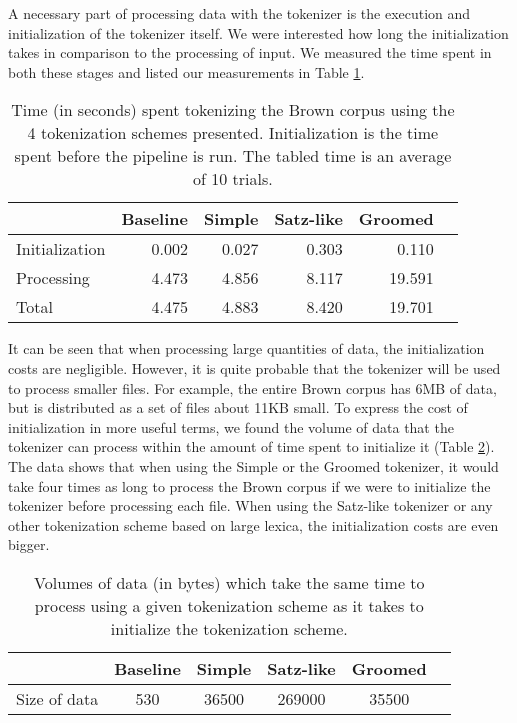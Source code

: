 A necessary part of processing data with the tokenizer is the execution and
initialization of the tokenizer itself. We were interested how long the
initialization takes in comparison to the processing of input. We measured the
time spent in both these stages and listed our measurements in Table
\ref{tbl:timeline}.

\begin{table}
  \begin{center}
    \begin{tabular}{ | l | r | r | r | r | r | }
      \hline
      & Baseline & Simple & Satz-like & Groomed \\ \hline
      Initialization & 0.002 & 0.027 & 0.303 & 0.110 \\ \hline
      Processing & 4.473 & 4.856 & 8.117 & 19.591 \\ \hline
      Total & 4.475 & 4.883 & 8.420 & 19.701 \\
      \hline
    \end{tabular}
  \end{center}
  \caption[Time spent in individual initialization steps]
    {Time (in seconds) spent tokenizing the Brown corpus using the 4
    tokenization schemes presented. Initialization is the time spent before the
    pipeline is run. The tabled time is an average of 10 trials.}
  \label{tbl:timeline}
\end{table}

It can be seen that when processing large quantities of data, the
initialization costs are negligible. However, it is quite probable that the
tokenizer will be used to process smaller files. For example, the entire Brown
corpus has 6MB of data, but is distributed as a set of files about 11KB small.
To express the cost of initialization in more useful terms, we found the volume
of data that the tokenizer can process within the amount of time spent to
initialize it (Table \ref{tbl:init-sizes}). The data shows that when using the
Simple or the Groomed tokenizer, it would take four times as long to process
the Brown corpus if we were to initialize the tokenizer before processing each
file. When using the Satz-like tokenizer or any other tokenization scheme based
on large lexica, the initialization costs are even bigger.

\begin{table}
  \begin{center}
    \begin{tabular}{ | l | c | c | c | c | c | }
      \hline
      & Baseline & Simple & Satz-like & Groomed \\ \hline
      Size of data & 530 & 36500 & 269000 & 35500 \\
      \hline
    \end{tabular}
  \end{center}
  \caption[Time spent initializing expressed as time spent processing data]
    {Volumes of data (in bytes) which take the same time to process using a
    given tokenization scheme as it takes to initialize the tokenization
    scheme.}
  \label{tbl:init-sizes}
\end{table}

